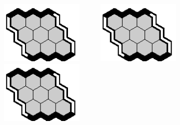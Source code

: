 \documentclass[12pt]{article}
\begin{document}
\begin{center}
\includegraphics[width=40mm]{fz/pix/3x3.eps}~~~~~~\includegraphics[width=40mm]{fz/pix/3x3.eps}~~~~~~\includegraphics[width=40mm]{fz/pix/3x3.eps}
\end{center}

\end{document}
